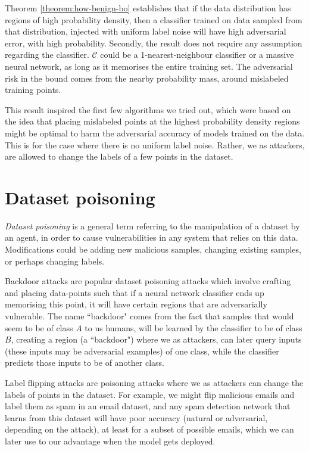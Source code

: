 \documentclass{ociamthesis}
\begin{document}
Theorem \ref{theorem:how-benign-bo} establishes that if the data distribution
has regions of high probability density, then a classifier trained on data
sampled from that distribution, injected with uniform label noise will have high
adversarial error, with high probability. Secondly, the result does not require
any assumption regarding the classifier. $\mathcal{C}$ could be a
1-nearest-neighbour classifier or a massive neural network, as long as it
memorises the entire training set. The adversarial risk in the bound comes from
the nearby probability mass, around mislabeled training points.


This result inspired the first few algorithms we tried out, which were based on
the idea that placing mislabeled points at the highest probability density
regions might be optimal to harm the adversarial accuracy of models trained on
the data. This is for the case where there is no uniform label noise. Rather, we
as attackers, are allowed to change the labels of a few points in the dataset.


\section{Dataset poisoning}
\emph{Dataset poisoning} \citep{just-how-toxic,
DBLP:journals/corr/abs-1712-05526} is a general term referring to the
manipulation of a dataset by an agent, in order to cause vulnerabilities in any
system that relies on this data. Modifications could be adding new malicious
samples, changing existing samples, or perhaps changing labels.

Backdoor attacks
\citep{DBLP:journals/corr/abs-1712-05526,hidden-trigger-backdoor,
transferable-clean-label-poisoning} are popular dataset poisoning attacks which
involve crafting and placing data-points such that if a neural network
classifier ends up memorising this point, it will have certain regions that are
adversarially vulnerable. The name ``backdoor" comes from the fact that samples
that would seem to be of class $A$ to us humans, will be learned by the
classifier to be of class $B$, creating a region (a ``backdoor") where we as
attackers, can later query inputs (these inputs may be adversarial examples) of
one class, while the classifier predicts those inputs to be of another class.

Label flipping attacks \citep{label-flip-SVMs,certified-robustness} are
poisoning attacks where we as attackers can change the labels of points in the
dataset. For example, we might flip malicious emails and label them as spam in
an email dataset, and any spam detection network that learns from this dataset
will have poor accuracy (natural or adversarial, depending on the attack), at
least for a subset of possible emails, which we can later use to our advantage
when the model gets deployed.
\end{document}
